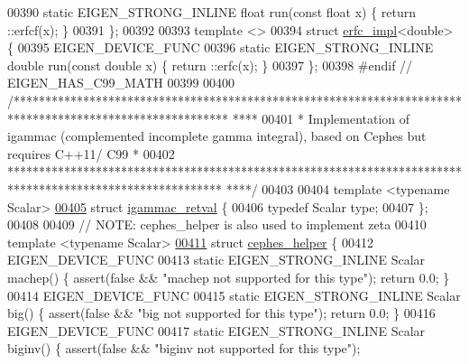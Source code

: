 \begin{DoxyCode}
00390   \textcolor{keyword}{static} EIGEN\_STRONG\_INLINE \textcolor{keywordtype}{float} run(\textcolor{keyword}{const} \textcolor{keywordtype}{float} x) \{ return ::erfcf(x); \}
00391 \};
00392 
00393 \textcolor{keyword}{template} <>
00394 \textcolor{keyword}{struct }\hyperlink{struct_eigen_1_1internal_1_1erfc__impl}{erfc\_impl}<double> \{
00395   EIGEN\_DEVICE\_FUNC
00396   \textcolor{keyword}{static} EIGEN\_STRONG\_INLINE \textcolor{keywordtype}{double} run(\textcolor{keyword}{const} \textcolor{keywordtype}{double} x) \{ return ::erfc(x); \}
00397 \};
00398 \textcolor{preprocessor}{#endif  // EIGEN\_HAS\_C99\_MATH}
00399 
00400 \textcolor{comment}{/**********************************************************************************************************
      ****}
00401 \textcolor{comment}{ * Implementation of igammac (complemented incomplete gamma integral), based on Cephes but requires C++11/
      C99 *}
00402 \textcolor{comment}{ **********************************************************************************************************
      ****/}
00403 
00404 \textcolor{keyword}{template} <\textcolor{keyword}{typename} Scalar>
\hyperlink{struct_eigen_1_1internal_1_1igammac__retval}{00405} \textcolor{keyword}{struct }\hyperlink{struct_eigen_1_1internal_1_1igammac__retval}{igammac\_retval} \{
00406   \textcolor{keyword}{typedef} Scalar type;
00407 \};
00408 
00409 \textcolor{comment}{// NOTE: cephes\_helper is also used to implement zeta}
00410 \textcolor{keyword}{template} <\textcolor{keyword}{typename} Scalar>
\hyperlink{struct_eigen_1_1internal_1_1cephes__helper}{00411} \textcolor{keyword}{struct }\hyperlink{struct_eigen_1_1internal_1_1cephes__helper}{cephes\_helper} \{
00412   EIGEN\_DEVICE\_FUNC
00413   \textcolor{keyword}{static} EIGEN\_STRONG\_INLINE Scalar machep() \{ assert(\textcolor{keyword}{false} && \textcolor{stringliteral}{"machep not supported for this type"}); \textcolor{keywordflow}{
      return} 0.0; \}
00414   EIGEN\_DEVICE\_FUNC
00415   \textcolor{keyword}{static} EIGEN\_STRONG\_INLINE Scalar big() \{ assert(\textcolor{keyword}{false} && \textcolor{stringliteral}{"big not supported for this type"}); \textcolor{keywordflow}{return} 0.0;
       \}
00416   EIGEN\_DEVICE\_FUNC
00417   \textcolor{keyword}{static} EIGEN\_STRONG\_INLINE Scalar biginv() \{ assert(\textcolor{keyword}{false} && \textcolor{stringliteral}{"biginv not supported for this type"}); \textcolor{keywordflow}{
}
\end{DoxyCode}
